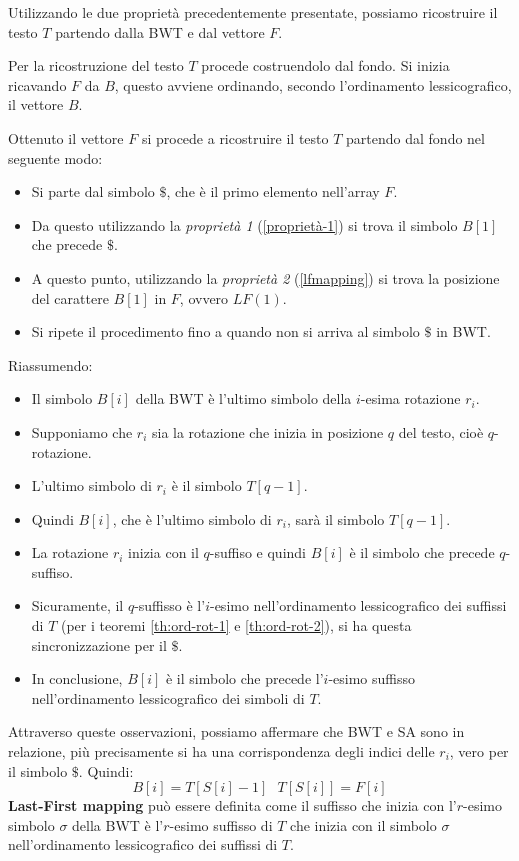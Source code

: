 Utilizzando le due proprietà precedentemente presentate, possiamo ricostruire il
testo $T$ partendo dalla BWT e dal vettore $F$.
\begin{esempio} 
    Per la ricostruzione del testo $T$ procede costruendolo dal fondo. Si inizia
    ricavando $F$ da $B$, questo avviene ordinando, secondo l'ordinamento
    lessicografico, il vettore $B$.

    Ottenuto il vettore $F$ si procede a ricostruire il testo $T$ partendo dal
    fondo nel seguente modo:
    \begin{itemize}
        \item Si parte dal simbolo $\$$, che è il primo elemento nell'array $F$.
        \item Da questo utilizzando la \textit{proprietà 1} (\ref{proprietà-1}) si
              trova il simbolo $B[1]$ che precede $\$$.
        \item A questo punto, utilizzando la \textit{proprietà 2} (\ref{lfmapping})
              si trova la posizione del carattere $B[1]$ in $F$, ovvero $LF(1)$.
        \item Si ripete il procedimento fino a quando non si arriva al simbolo
              $\$$ in BWT.
    \end{itemize}
\end{esempio}
Riassumendo:
\begin{itemize}
    \item Il simbolo $B[i]$ della BWT è l'ultimo simbolo della $i$-esima rotazione
          $r_i$.
    \item Supponiamo che $r_i$ sia la rotazione che inizia in posizione $q$ del
          testo, cioè $q$-rotazione.
    \item L'ultimo simbolo di $r_i$ è il simbolo $T[q - 1]$.
    \item Quindi $B[i]$, che è l'ultimo simbolo di $r_i$, sarà il simbolo $T[q - 1]$.
    \item La rotazione $r_i$ inizia con il $q$-suffiso e quindi $B[i]$ è il simbolo
          che precede $q$-suffiso.
    \item Sicuramente, il $q$-suffisso è l'$i$-esimo nell'ordinamento lessicografico
          dei suffissi di $T$ (per i teoremi \ref{th:ord-rot-1} e \ref{th:ord-rot-2}),
          si ha questa sincronizzazione per il $\$$.
    \item In conclusione, $B[i]$ è il simbolo che precede l'$i$-esimo suffisso
          nell'ordinamento lessicografico dei simboli di $T$.
\end{itemize}
Attraverso queste osservazioni, possiamo affermare che BWT e SA sono in relazione,
più precisamente si ha una corrispondenza degli indici delle $r_i$, vero per il
simbolo $\$$. Quindi:
\begin{equation}
    B[i] = T[S[i]-1] \ \ \ T[S[i]] = F[i]
\end{equation}
\textbf{Last-First mapping} può essere definita come il suffisso che inizia con
l'$r$-esimo simbolo $\sigma$ della BWT è l'$r$-esimo suffisso di $T$ che inizia
con il simbolo $\sigma$ nell'ordinamento lessicografico dei suffissi di $T$.

